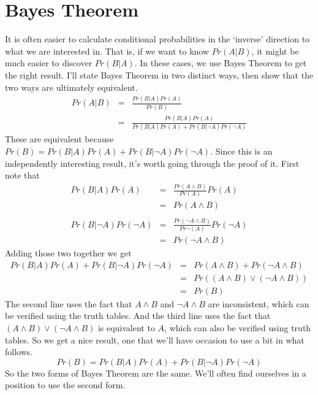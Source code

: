 \section{Bayes Theorem}
It is often easier to calculate conditional probabilities in the `inverse' direction to what we are interested in. That is, if we want to know $Pr(A | B)$, it might be much easier to discover $Pr(B | A)$. In these cases, we use Bayes Theorem to get the right result. I'll state Bayes Theorem in two distinct ways, then show that the two ways are ultimately equivalent.
\begin{eqnarray*}
Pr(A|B) &=& \frac{Pr(B|A) Pr(A)}{Pr(B)} \\
 &=&  \frac{Pr(B|A) Pr(A)}{Pr(B|A)Pr(A) + Pr(B|\neg A)Pr(\neg A)}
\end{eqnarray*}
These are equivalent because $Pr(B) = Pr(B|A)Pr(A) + Pr(B|\neg A)Pr(\neg A)$. Since this is an independently interesting result, it's worth going through the proof of it. First note that
\begin{eqnarray*}
Pr(B|A)Pr(A) &=& \frac{Pr(A \wedge B)}{Pr(A)} Pr(A) \\
 &=& Pr(A \wedge B) \\
 \\
Pr(B|\neg A)Pr(\neg A) &=& \frac{Pr(\neg A \wedge B)}{Pr\neg (A)} Pr(\neg A) \\
 &=& Pr(\neg A \wedge B)
\end{eqnarray*} Adding those two together we get
\begin{eqnarray*}
Pr(B|A)Pr(A) + Pr(B|\neg A)Pr(\neg A) &=& Pr(A \wedge B) + Pr(\neg A \wedge B) \\
  &=& Pr((A \wedge B) \vee (\neg A \wedge B)) \\
  &=& Pr(B)
\end{eqnarray*} The second line uses the fact that $A \wedge B$ and $\neg A \wedge B$ are inconsistent, which can be verified using the truth tables. And the third line uses the fact that $(A \wedge B) \vee (\neg A \wedge B)$ is equivalent to $A$, which can also be verified using truth tables. So we get a nice result, one that we'll have occasion to use a bit in what follows.
\begin{equation*}
Pr(B) = Pr(B|A)Pr(A) + Pr(B|\neg A)Pr(\neg A)
\end{equation*} So the two forms of Bayes Theorem are the same. We'll often find ourselves in a position to use the second form. 

